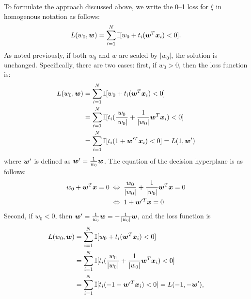 To formulate the approach discussed above, we write 
the 0--1 loss for $\xi$ in homogenous notation as follows:
\begin{equation}\label{eq:loss}
L(w_0,\boldsymbol{w}) = \sum_{i=1}^N \mathbb{I} [w_0 + t_i (\boldsymbol{w}^T \boldsymbol{x}_i) < 0].
\end{equation}
%
As noted previously, if both $w_0$ and $w$ are scaled by $|w_0|$, the
solution is unchanged.  Specifically, there are two
cases: first, if $w_0>0$, then the loss function is:
\begin{align*}
L(w_0,\boldsymbol{w}) &= \sum_{i=1}^N \mathbb{I} [w_0 + t_i (\boldsymbol{w}^T \boldsymbol{x}_i) < 0] \\
&=\sum_{i=1}^N \mathbb{I} [t_i (\frac{w_0}{|w_0|} + \frac{1}{|w_0|}\boldsymbol{w}^T \boldsymbol{x}_i) < 0]  \\
&= \sum_{i=1}^N \mathbb{I} [t_i (1 + \boldsymbol{w}'^T \boldsymbol{x}_i) < 0] = L(1, \boldsymbol{w}')
\end{align*}
where $\boldsymbol{w}'$ is defined as $\boldsymbol{w}' = \frac{1}{w_0}\boldsymbol{w}$. The equation of the
decision hyperplane is as follows:
\begin{align*}
w_0 + \boldsymbol{w}^T\boldsymbol{x} = 0 \; & \Leftrightarrow \; \frac{w_0}{|w_0|} + \frac{1}{|w_0|} \boldsymbol{w}^T \boldsymbol{x}  = 0 \\ 
& \Leftrightarrow \; 1 + \boldsymbol{w}'^T \boldsymbol{x} = 0
\end{align*}
Second, if $w_0 < 0$, then $\boldsymbol{w}' = \frac{1}{w_0}\boldsymbol{w} = -\frac{1}{|w_0|}\boldsymbol{w}$, and the loss function is 
\begin{align*}
L(w_0,\boldsymbol{w}) &= \sum_{i=1}^N \mathbb{I} [w_0 + t_i (\boldsymbol{w}^T \boldsymbol{x}_i) < 0] \\
&=\sum_{i=1}^N \mathbb{I} [t_i (\frac{w_0}{|w_0|} + \frac{1}{|w_0|}\boldsymbol{w}^T \boldsymbol{x}_i) < 0]  \\
&= \sum_{i=1}^N \mathbb{I} [t_i (-1 - \boldsymbol{w}'^T \boldsymbol{x}_i) < 0] 
= L(-1, -\boldsymbol{w}'),
\end{align*}
